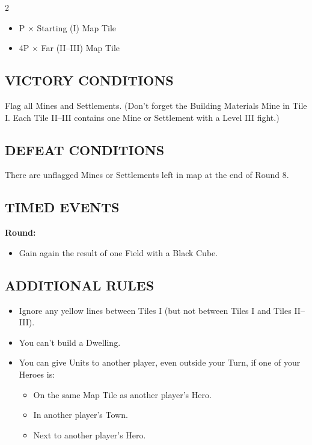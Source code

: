 \begin{multicols}{2}
\begin{itemize}
  \item P × Starting (I) Map Tile
  \item 4P × Far (II--III) Map Tile
\end{itemize}

\subsection*{\MakeUppercase{Victory Conditions}}

Flag all Mines and Settlements. (Don't forget the Building Materials Mine in Tile I. Each Tile II--III contains one Mine or Settlement with a Level III fight.)

\subsection*{\MakeUppercase{Defeat Conditions}}

There are unflagged Mines or Settlements left in map at the end of Round 8.

\subsection*{\MakeUppercase{Timed Events}}

\textbf{ Round:}
\begin{itemize}
  \item Gain again the result of one Field with a Black Cube.
\end{itemize}

\subsection*{\MakeUppercase{Additional Rules}}

\begin{itemize}
    \item Ignore any yellow lines between Tiles I (but not between Tiles I and Tiles II--III).

    \item You can't build a  Dwelling.

    \item You can give Units to another player, even outside your Turn, if one of your Heroes is:
    \begin{itemize}
        \item On the same Map Tile as another player's Hero.
        \item In another player's Town.
        \item Next to another player's Hero.
    \end{itemize}


\end{itemize}
\end{multicols}
